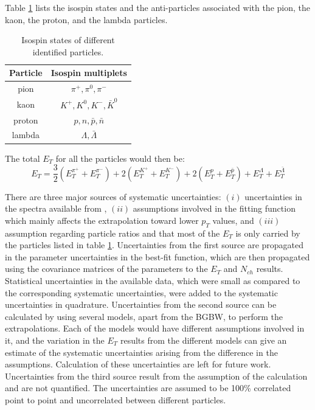 Table \ref{table:isospinStates} lists the isospin states and the anti-particles associated with the pion, the kaon, the proton, and the lambda particles.
	\begin{table}[h!]
	\centering
	\begin{tabular}{|c c|}
	\hline
	Particle & Isospin multiplets \\ [0.5ex]
	\hline
	\hline
	pion & $\pi^{+}, \pi^{0}, \pi^{-} $ \\
	kaon & $K^{+}, K^{0}, K^{-}, \bar{K}^{0}$ \\
	proton & $p, n, \bar{p}, \bar{n}$  \\
	lambda & $\Lambda, \bar{\Lambda}$  \\ [1ex]
	\hline
	\end{tabular}
	\caption{Isospin states of different identified particles.}
	\label{table:isospinStates}
	\end{table}
	
The total $E_{T}$ for all the particles would then be:	
	\begin{equation}\label{eqn:TotET}
	E_{T} = \frac{3}{2}(E_{T}^{\pi^{+}}+E_{T}^{\pi^{-}}) + 2(E_{T}^{K^{+}}+E_{T}^{K^{-}}) + 2(E_{T}^{p}+E_{T}^{\bar{p}}) + E_{T}^{\Lambda} + E_{T}^{\bar{\Lambda}}
	\end{equation}
	
There are three major sources of systematic uncertainties: $(i)$ uncertainties in the spectra available from \cite{PhysRevC.96.044904}, $(ii)$ assumptions involved in the fitting function which mainly affects the extrapolation toward lower $p_{T}$ values, and $(iii)$ assumption regarding particle ratios and that most of the $E_{T}$ is only carried by the particles listed in table \ref{table:isospinStates}. Uncertainties from the first source are propagated in the parameter uncertainties in the best-fit function, which are then propagated using the covariance matrices of the parameters to the $E_{T}$ and $N_{ch}$ results. Statistical uncertainties in the available data, which were small as compared to the corresponding systematic uncertainties, were added to the systematic uncertainties in quadrature. Uncertainties from the second source can be calculated by using several models, apart from the BGBW, to perform the extrapolations. Each of the models would have different assumptions involved in it, and the variation in the $E_{T}$ results from the different models can give an estimate of the systematic uncertainties arising from the difference in the assumptions. Calculation of these uncertainties are left for future work. Uncertainties from the third source result from the assumption of the calculation and are not quantified. The uncertainties are assumed to be 100\% correlated point to point and uncorrelated between different particles.
 
